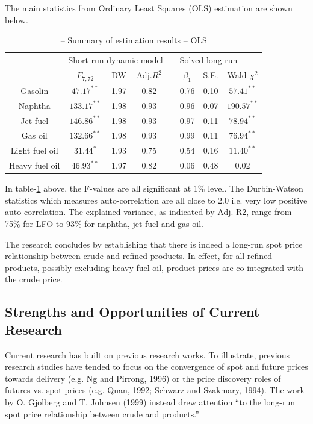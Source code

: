\documentclass[a4paper,10pt]{article}
\begin{document}
\noindent The main statistics from Ordinary Least Squares (OLS) estimation are shown below.

\begin{table}[ht]

\begin{tabular}{|c@{\qquad}cccc@{\qquad}ccc|}
  \hline
  \multicolumn{1}{|l}{} & \multicolumn{3}{l}{{Short run dynamic model}} & \multicolumn{1}{l}{}& \multicolumn{3}{l|}{{Solved long-run}} \\ 
  \cline{2-4}
  \cline{6-8}
  & $F_{7, 72}$ & DW & Adj.$R^{2}$& &$\beta_{1}$ & S.E. & Wald $\chi^{2}$ \\
  \hline
  Gasolin & $47.17^{**}$ & 1.97 & 0.82 & &0.76 &0.10 &$57.41^{**}$ \\
  Naphtha & $133.17^{**}$ & 1.98 & 0.93 & &0.96 & 0.07 & $190.57^{**}$ \\
  Jet fuel & $146.86^{**}$ & 1.98 & 0.93 & &0.97 & 0.11 & $78.94^{**}$ \\
  Gas oil & $132.66^{**}$ & 1.98 & 0.93 & &0.99 & 0.11 & $76.94^{**}$ \\
  Light fuel oil & $31.44^{*}$ & 1.93 & 0.75 & &0.54 & 0.16 & $11.40^{**}$ \\
  Heavy fuel oil & $46.93^{**}$ & 1.97 & 0.82 & &0.06 & 0.48 & 0.02\\
  \hline
\end{tabular}
\caption{– Summary of estimation results – OLS}
\label{tab:ols}
\end{table}

\noindent In table-\ref{tab:ols} above, the F-values are all significant at 1\% level. The Durbin-Watson statistics which measures auto-correlation are all close to 2.0 i.e. very low positive auto-correlation. The explained variance, as indicated by Adj. R2, range from 75\% for LFO to 93\% for naphtha, jet fuel and gas oil.

The research concludes by establishing that there is indeed a long-run spot price relationship between crude and refined products. In effect, for all refined products, possibly excluding heavy fuel oil, product prices are co-integrated with the crude price\cite{ben94}.
\subsection{Strengths and Opportunities of Current Research}
Current research has built on previous research works. To illustrate, previous research studies have tended to focus on the convergence of spot and future prices towards delivery (e.g. Ng and Pirrong, 1996)\cite{pir96} or the price discovery roles of futures vs. spot prices (e.g. Quan, 1992; Schwarz and Szakmary, 1994)\cite{qua92}. The work by O. Gjolberg and T. Johnsen (1999) instead drew attention “to the long-run spot price relationship between crude and products.”
\end{document}
